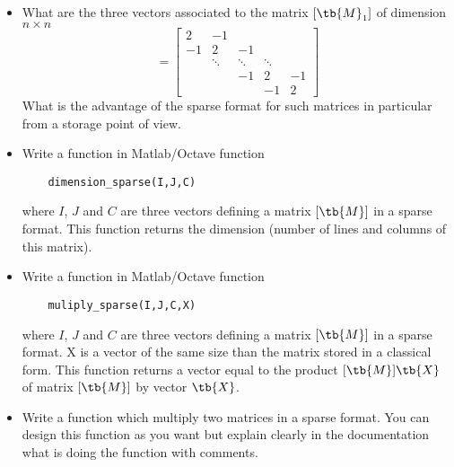 \begin{itemize}
	\item What are the three vectors associated to the matrix $[\tb{M}_1]$ of dimension $n\times n$ 
\begin{equation}
	[\tb{M}_1]=\begin{bmatrix}
		2 & -1 \\
		-1&2 &-1\\
		&\ddots&\ddots &\ddots \\
		&&-1&2&-1\\
		 &&&-1&2
	\end{bmatrix}
\end{equation}
What is the advantage of the sparse format for such matrices in particular from a storage point of view.
\item Write a function in Matlab/Octave function 
\begin{verbatim}
	dimension_sparse(I,J,C)
\end{verbatim}
where $I$, $J$ and $C$ are three vectors defining a matrix $[\tb{M}]$ in a sparse format. This function returns the dimension (number of lines and columns of this matrix). 
\item Write a function in Matlab/Octave function 
\begin{verbatim}
	muliply_sparse(I,J,C,X)
\end{verbatim}
where $I$, $J$ and $C$ are three vectors defining a matrix $[\tb{M}]$ in a sparse format. X is a vector of the same size than the matrix stored in a classical form. This function returns a vector equal to the product $[\tb{M}]\tb{X}$ of matrix $[\tb{M}]$ by vector $\tb{X}$.
\item Write a function which multiply two matrices in a sparse format. You can design this function as you want but explain clearly in the documentation what is doing the function with comments.
\end{itemize}




\eexo
\solution{
}
